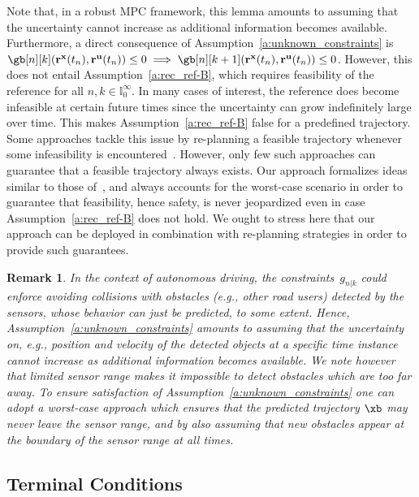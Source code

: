 \documentclass[journal]{IEEEtran}
\newcommand{\x}{{\mathbf{x}}}
\renewcommand{\u}{{\mathbf{u}}}
\renewcommand{\r}{{\mathbf{r}}}
\newcommand{\review}[1]{#1}
\newtheorem{Remark}{Remark}
\begin{document}
	Note that, in a robust MPC framework, this lemma amounts to assuming that the uncertainty cannot increase as additional information becomes available.
	Furthermore, a direct consequence of Assumption~\ref{a:unknown_constraints} is $\gb[n][k](\r^\x(t_n),\r^\u(t_n))\leq{}0\implies \gb[n][k+1](\r^\x(t_n),\r^\u(t_n))\leq{}0$. However, this does not entail Assumption~\ref{a:rec_ref-B}, which requires feasibility of the reference for all $n,k\in\mathbb{I}_0^\infty$. In many cases of interest, the reference does become infeasible at certain future times since the uncertainty can grow indefinitely large over time. This makes Assumption~\ref{a:rec_ref-B} false for a predefined trajectory. Some approaches tackle this issue by re-planning a feasible trajectory whenever some infeasibility is encountered~\cite{fulgenzi2008probabilistic}. However, only few such approaches can guarantee that a feasible trajectory always exists. 
	Our approach formalizes ideas similar to those of~\cite{petti2005safe,liu2017provably}, and always accounts for the worst-case scenario in order to guarantee that feasibility, hence safety, is never jeopardized even in case Assumption~\ref{a:rec_ref-B} does not hold. We ought to stress here that our approach can be deployed in combination with re-planning strategies in order to provide such guarantees.  
		
	\begin{Remark}
		In the context of autonomous driving, the constraints~$g_{n|k}$ could enforce avoiding collisions with obstacles (e.g., other road users) detected by the sensors, whose behavior can just be predicted, to some extent. Hence, Assumption~\ref{a:unknown_constraints} amounts to assuming that the uncertainty on, e.g., position and velocity of the detected objects at a specific time instance cannot increase as additional information becomes available. \review{We note however that limited sensor range makes it impossible to detect obstacles which are too far away. To ensure satisfaction of Assumption~\ref{a:unknown_constraints} one can adopt a worst-case approach which ensures that the predicted trajectory $\xb$ may never leave the sensor range, and by also assuming that new obstacles appear at the boundary of the sensor range at all times.}
	\end{Remark}
	
	\subsection{Terminal Conditions}
	\label{sec:terminal_safe_set}
	
\end{document}
